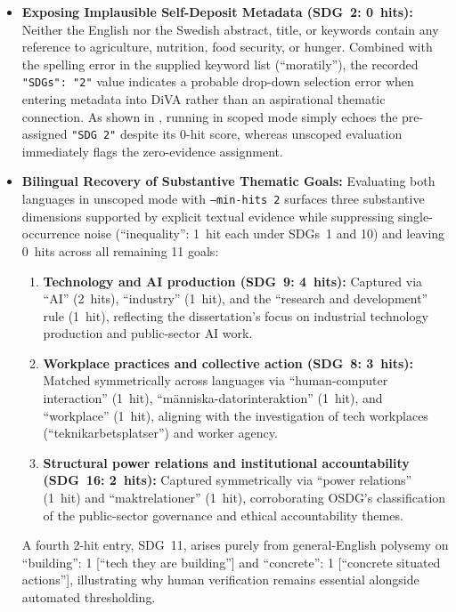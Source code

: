 \begin{casestudySection}
\begin{itemize}
  \item \textbf{Exposing Implausible Self-Deposit Metadata (\gls{SDG}~2: \num{0}~hits):} Neither the English nor the Swedish abstract, title, or keywords contain any reference to agriculture, nutrition, food security, or hunger. Combined with the spelling error in the supplied keyword list (\enquote{moratily}), the recorded \texttt{"SDGs": "2"} value indicates a probable drop-down selection error when entering metadata into \gls{DiVA} rather than an aspirational thematic connection. As shown in , running in scoped mode simply echoes the pre-assigned \texttt{"SDG 2"} despite its \num{0}-hit score, whereas unscoped evaluation immediately flags the zero-evidence assignment.
  
  \item \textbf{Bilingual Recovery of Substantive Thematic Goals:} Evaluating both languages in unscoped mode with \texttt{--min-hits 2} surfaces three substantive dimensions supported by explicit textual evidence while suppressing single-occurrence noise (\enquote{inequality}: \num{1}~hit each under \glspl{SDG}~1 and 10) and leaving \num{0}~hits across all remaining \num{11} goals:
  \begin{enumerate}
    \item \textbf{Technology and \gls{AI} production (\gls{SDG}~9: \num{4}~hits):} Captured via \enquote{AI} (\num{2}~hits), \enquote{industry} (\num{1}~hit), and the \enquote{research and development} rule (\num{1}~hit), reflecting the dissertation's focus on industrial technology production and public-sector \gls{AI} work.
    
    \item \textbf{Workplace practices and collective action (\gls{SDG}~8: \num{3}~hits):} Matched symmetrically across languages via \enquote{human-computer interaction} (\num{1}~hit), \enquote{\foreignlanguage{swedish}{människa-datorinteraktion}} (\num{1}~hit), and \enquote{workplace} (\num{1}~hit), aligning with the investigation of tech workplaces (\enquote{\foreignlanguage{swedish}{teknikarbetsplatser}}) and worker agency.
    
    \item \textbf{Structural power relations and institutional accountability (\gls{SDG}~16: \num{2}~hits):} Captured symmetrically via \enquote{power relations} (\num{1}~hit) and \enquote{\foreignlanguage{swedish}{maktrelationer}} (\num{1}~hit), corroborating OSDG's classification of the public-sector governance and ethical accountability themes.
  \end{enumerate}
  
  A fourth \num{2}-hit entry, \gls{SDG}~11, arises purely from general-English polysemy on \enquote{building}: \num{1} [\enquote{tech they are building}] and \enquote{concrete}: \num{1} [\enquote{concrete situated actions}], illustrating why human verification remains essential alongside automated thresholding.
\end{itemize}
\end{casestudySection}

